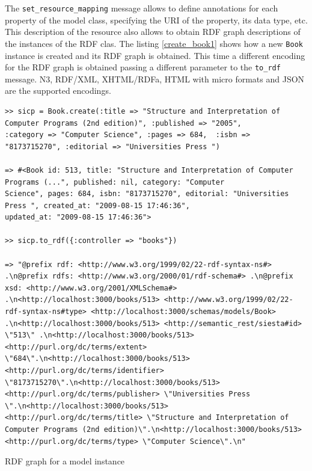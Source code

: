 The \texttt{set\_resource\_mapping} message allows to define annotations for each property of the
model class, specifying the URI of the property, its data type, etc.\\

This description of the resource also allows to obtain RDF graph descriptions of the instances of the RDF clas. The
listing \ref{create_book1} shows how a new \texttt{Book} instance is created and its RDF graph is obtained. This time a
different encoding for the RDF graph is obtained passing a different parameter to the \texttt{to\_rdf} message. N3, RDF/XML, XHTML/RDFa, HTML with micro formats and JSON are the supported encodings.

\begin{table}
\vspace{5 mm}
\begin{lstlisting}
>> sicp = Book.create(:title => "Structure and Interpretation of Computer Programs (2nd edition)", :published => "2005",
:category => "Computer Science", :pages => 684,  :isbn => "8173715270", :editorial => "Universities Press ")

=> #<Book id: 513, title: "Structure and Interpretation of Computer Programs (...", published: nil, category: "Computer
Science", pages: 684, isbn: "8173715270", editorial: "Universities Press ", created_at: "2009-08-15 17:46:36",
updated_at: "2009-08-15 17:46:36">

>> sicp.to_rdf({:controller => "books"})

=> "@prefix rdf: <http://www.w3.org/1999/02/22-rdf-syntax-ns#> .\n@prefix rdfs: <http://www.w3.org/2000/01/rdf-schema#> .\n@prefix xsd: <http://www.w3.org/2001/XMLSchema#> .\n<http://localhost:3000/books/513> <http://www.w3.org/1999/02/22-rdf-syntax-ns#type> <http://localhost:3000/schemas/models/Book> .\n<http://localhost:3000/books/513> <http://semantic_rest/siesta#id> \"513\" .\n<http://localhost:3000/books/513> <http://purl.org/dc/terms/extent> \"684\".\n<http://localhost:3000/books/513> <http://purl.org/dc/terms/identifier> \"8173715270\".\n<http://localhost:3000/books/513> <http://purl.org/dc/terms/publisher> \"Universities Press \".\n<http://localhost:3000/books/513> <http://purl.org/dc/terms/title> \"Structure and Interpretation of Computer Programs (2nd edition)\".\n<http://localhost:3000/books/513> <http://purl.org/dc/terms/type> \"Computer Science\".\n"
\end{lstlisting} 
\vspace{5 mm}
\caption{RDF graph for a model instance}
\label{create_book1}
\end{table}


